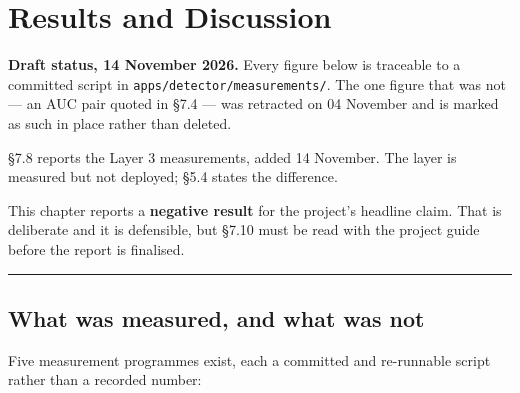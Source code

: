 \hypertarget{results-and-discussion}{%
\chapter{Results and Discussion}\label{results-and-discussion}}

\begin{draftnote}

\textbf{Draft status, 14 November 2026.} Every figure below is traceable
to a committed script in \texttt{apps/detector/measurements/}. The one
figure that was not --- an AUC pair quoted in \S{}7.4 --- was retracted on
04 November and is marked as such in place rather than deleted.

\S{}7.8 reports the Layer 3 measurements, added 14 November. The layer is
measured but not deployed; \S{}5.4 states the difference.

This chapter reports a \textbf{negative result} for the project's
headline claim. That is deliberate and it is defensible, but \S{}7.10 must
be read with the project guide before the report is finalised.

\end{draftnote}

\begin{center}\rule{0.5\linewidth}{0.5pt}\end{center}

\hypertarget{what-was-measured-and-what-was-not}{%
\section{What was measured, and what was
not}\label{what-was-measured-and-what-was-not}}

Five measurement programmes exist, each a committed and re-runnable
script rather than a recorded number:

